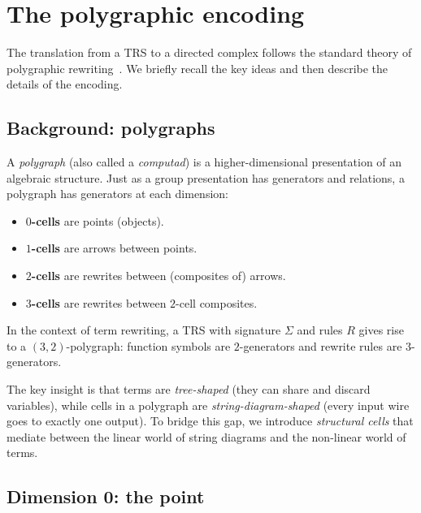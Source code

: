 \documentclass[acmsmall,screen,nonacm]{acmart}
\begin{document}
\section{The polygraphic encoding}
\label{sec:encoding}

The translation from a TRS to a directed complex follows the standard
theory of polygraphic rewriting~\cite{Burroni1993,Guiraud2019}.  We
briefly recall the key ideas and then describe the details of the
encoding.

\subsection{Background: polygraphs}
\label{sec:background}

A \emph{polygraph} (also called a \emph{computad}) is a
higher-dimensional presentation of an algebraic structure.  Just as a
group presentation has generators and relations, a polygraph has
generators at each dimension:
\begin{itemize}
\item \textbf{$0$-cells} are points (objects).
\item \textbf{$1$-cells} are arrows between points.
\item \textbf{$2$-cells} are rewrites between (composites of) arrows.
\item \textbf{$3$-cells} are rewrites between $2$-cell composites.
\end{itemize}
In the context of term rewriting, a TRS with signature $\Sigma$ and
rules $R$ gives rise to a $(3,2)$-polygraph: function symbols are
$2$-generators and rewrite rules are $3$-generators.

The key insight is that terms are \emph{tree-shaped} (they can share
and discard variables), while cells in a polygraph are
\emph{string-diagram-shaped} (every input wire goes to exactly one
output).  To bridge this gap, we introduce \emph{structural cells} that
mediate between the linear world of string diagrams and the non-linear
world of terms.

\subsection{Dimension 0: the point}
\label{sec:dim0}
\end{document}
